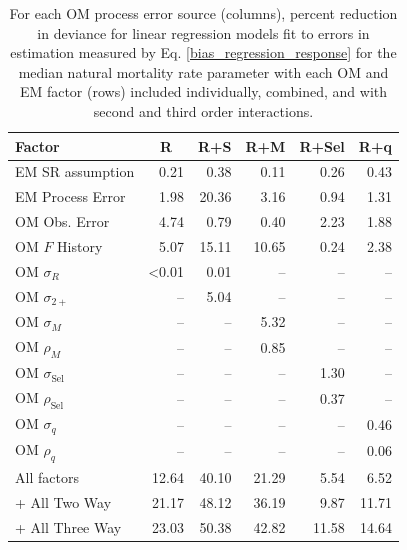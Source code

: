 \documentclass[
  12pt,
]{article}
\begin{document}
\begin{table}
\caption{For each OM process error source (columns), percent reduction in deviance for linear regression models fit to errors in estimation measured by Eq. \ref{bias_regression_response} for the median natural mortality rate parameter with each OM and EM factor (rows) included individually, combined, and with second and third order interactions.}\label{bias_median_M_PRD_table}
{\begin{center}
\begin{tabular}{lrrrrr}
\hline\hline
\multicolumn{1}{l}{Factor}&\multicolumn{1}{c}{R}&\multicolumn{1}{c}{R+S}&\multicolumn{1}{c}{R+M}&\multicolumn{1}{c}{R+Sel}&\multicolumn{1}{c}{R+q}\tabularnewline
\hline
EM SR assumption& 0.21& 0.38& 0.11& 0.26& 0.43\tabularnewline
EM Process Error& 1.98&20.36& 3.16& 0.94& 1.31\tabularnewline
OM Obs. Error& 4.74& 0.79& 0.40& 2.23& 1.88\tabularnewline
OM $F$ History& 5.07&15.11&10.65& 0.24& 2.38\tabularnewline
OM $\sigma_R$&\textless  0.01& 0.01&--&--&--\tabularnewline
OM $\sigma_{2+}$ &--& 5.04&--&--&--\tabularnewline
OM $\sigma_M$&--&--& 5.32&--&--\tabularnewline
OM $\rho_M$&--&--& 0.85&--&--\tabularnewline
OM $\sigma_{\text{Sel}}$&--&--&--& 1.30&--\tabularnewline
OM $\rho_{\text{Sel}}$&--&--&--& 0.37&--\tabularnewline
OM $\sigma_q$&--&--&--&--& 0.46\tabularnewline
OM $\rho_q$&--&--&--&--& 0.06\tabularnewline
All factors&12.64&40.10&21.29& 5.54& 6.52\tabularnewline
+ All Two Way&21.17&48.12&36.19& 9.87&11.71\tabularnewline
+ All Three Way&23.03&50.38&42.82&11.58&14.64\tabularnewline
\hline
\end{tabular}\end{center}
}
\end{table}
\end{document}
